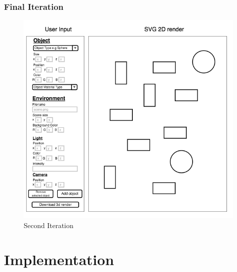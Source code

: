 \documentclass[a4paper]{report}
\begin{document}
	\subsection{Final Iteration}
	
	
	
	
	
	\begin{figure}[ht!]
		\centering
		\includegraphics[scale=0.85]{second_prototype.png}
		\caption{Second Iteration}
		\label{fig:secondIt}
	\end{figure}
	
	
	
	
	
	\chapter{Implementation}
	
\end{document}
